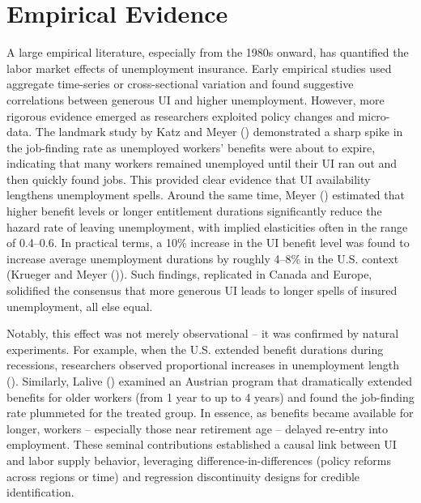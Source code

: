 \documentclass[
  4pt,
]{report}
\begin{document}
\section{Empirical Evidence}\label{empirical-evidence}

A large empirical literature, especially from the 1980s onward, has
quantified the labor market effects of unemployment insurance. Early
empirical studies used aggregate time-series or cross-sectional
variation and found suggestive correlations between generous UI and
higher unemployment. However, more rigorous evidence emerged as
researchers exploited policy changes and micro-data. The landmark study
by Katz and Meyer () demonstrated a sharp
spike in the job-finding rate as unemployed workers' benefits were about
to expire, indicating that many workers remained unemployed until their
UI ran out and then quickly found jobs. This provided clear evidence
that UI availability lengthens unemployment spells. Around the same
time, Meyer () estimated that higher
benefit levels or longer entitlement durations significantly reduce the
hazard rate of leaving unemployment, with implied elasticities often in
the range of 0.4--0.6. In practical terms, a 10\% increase in the UI
benefit level was found to increase average unemployment durations by
roughly 4--8\% in the U.S. context (Krueger and Meyer
()). Such findings, replicated in Canada
and Europe, solidified the consensus that more generous UI leads to
longer spells of insured unemployment, all else equal.

Notably, this effect was not merely observational -- it was confirmed by
natural experiments. For example, when the U.S. extended benefit
durations during recessions, researchers observed proportional increases
in unemployment length ().
Similarly, Lalive () examined an Austrian
program that dramatically extended benefits for older workers (from 1
year to up to 4 years) and found the job-finding rate plummeted for the
treated group. In essence, as benefits became available for longer,
workers -- especially those near retirement age -- delayed re-entry into
employment. These seminal contributions established a causal link
between UI and labor supply behavior, leveraging
difference-in-differences (policy reforms across regions or time) and
regression discontinuity designs for credible identification.
\end{document}
